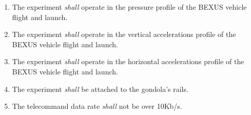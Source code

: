 \begin{enumerate}[label=D.\arabic*]
    \item The experiment \textit{shall} operate in the pressure profile of the BEXUS vehicle flight and launch.
    \item The experiment \textit{shall} operate in the vertical accelerations profile of the BEXUS vehicle flight and launch.
    \item The experiment \textit{shall} operate in the
    horizontal accelerations profile of the BEXUS vehicle flight and launch.
    \item The experiment \textit{shall} be attached to the gondola's rails.
    \item The telecommand data rate \textit{shall} not be over 10Kb/s.
\end{enumerate}